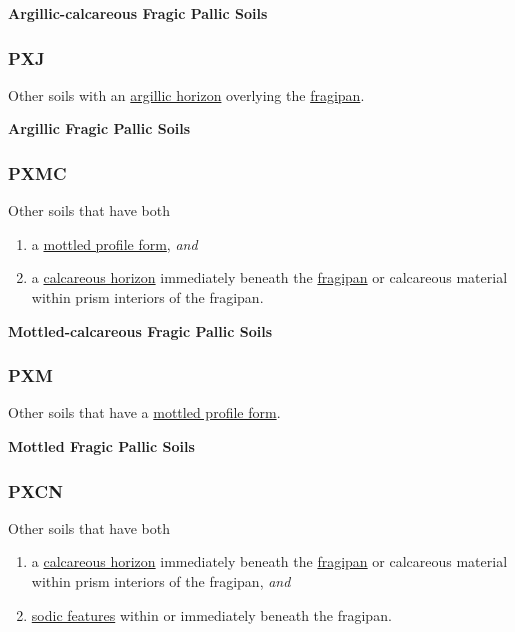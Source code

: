 \documentclass[
  letterpaper,
  DIV=11,
  numbers=noendperiod]{scrreprt}
\providecommand{\tightlist}{%
  \setlength{\itemsep}{0pt}\setlength{\parskip}{0pt}}\usepackage{longtable,booktabs,array}
\begin{document}
\textbf{Argillic-calcareous Fragic Pallic Soils}

\hypertarget{sec-key-PXJ}{%
\subsubsection{\texorpdfstring{\textbf{PXJ}}{PXJ}}\label{sec-key-PXJ}}

Other soils with an \protect\hyperlink{sec-diag-argh}{argillic horizon}
overlying the \protect\hyperlink{sec-diag-fpan}{fragipan}.

\textbf{Argillic Fragic Pallic Soils}

\hypertarget{sec-key-PXMC}{%
\subsubsection{\texorpdfstring{\textbf{PXMC}}{PXMC}}\label{sec-key-PXMC}}

Other soils that have both

\begin{enumerate}
\def\labelenumi{\arabic{enumi}.}
\tightlist
\item
  a \protect\hyperlink{sec-diag-mottpf}{mottled profile form},
  \emph{and}
\item
  a \protect\hyperlink{sec-diag-calch}{calcareous horizon} immediately
  beneath the \protect\hyperlink{sec-diag-fpan}{fragipan} or calcareous
  material within prism interiors of the fragipan.
\end{enumerate}

\textbf{Mottled-calcareous Fragic Pallic Soils}

\hypertarget{sec-key-PXM}{%
\subsubsection{\texorpdfstring{\textbf{PXM}}{PXM}}\label{sec-key-PXM}}

Other soils that have a \protect\hyperlink{sec-diag-mottpf}{mottled
profile form}.

\textbf{Mottled Fragic Pallic Soils}

\hypertarget{sec-key-PXCN}{%
\subsubsection{\texorpdfstring{\textbf{PXCN}}{PXCN}}\label{sec-key-PXCN}}

Other soils that have both

\begin{enumerate}
\def\labelenumi{\arabic{enumi}.}
\tightlist
\item
  a \protect\hyperlink{sec-diag-calch}{calcareous horizon} immediately
  beneath the \protect\hyperlink{sec-diag-fpan}{fragipan} or calcareous
  material within prism interiors of the fragipan, \emph{and}
\item
  \protect\hyperlink{sec-diag-sod}{sodic features} within or immediately
  beneath the fragipan.
\end{enumerate}
\end{document}
